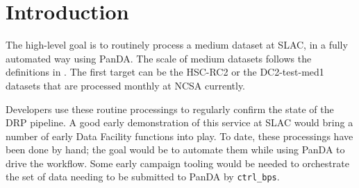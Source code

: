 \section{Introduction}

The high-level goal is to routinely process a medium dataset at SLAC, in a fully automated way using PanDA.
The scale of medium datasets follows the definitions in .
The first target can be the HSC-RC2 or the DC2-test-med1 datasets that are processed monthly at NCSA currently.

Developers use these routine processings to regularly confirm the state of the DRP pipeline. A good early demonstration of this service at SLAC would bring a number of early Data Facility functions into play. To date, these processings have been done by hand; the goal would be to automate them while using PanDA to drive the workflow. Some early campaign tooling would be needed to orchestrate the set of data needing to be submitted to PanDA by \texttt{ctrl\_bps}.
